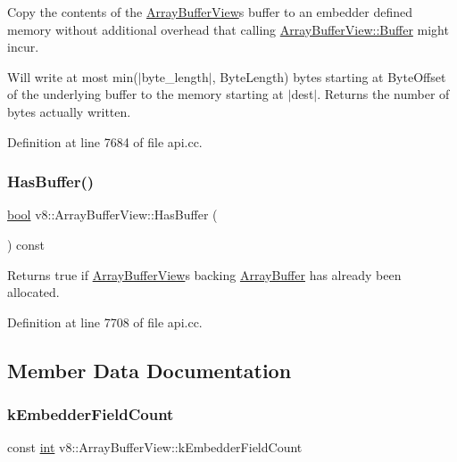 Copy the contents of the \mbox{\hyperlink{classv8_1_1ArrayBufferView}{Array\+Buffer\+View}}\textquotesingle{}s buffer to an embedder defined memory without additional overhead that calling \mbox{\hyperlink{classv8_1_1ArrayBufferView_a134c62b37be7a9e8437a56b832f1800a}{Array\+Buffer\+View\+::\+Buffer}} might incur.

Will write at most min($\vert$byte\+\_\+length$\vert$, Byte\+Length) bytes starting at Byte\+Offset of the underlying buffer to the memory starting at $\vert$dest$\vert$. Returns the number of bytes actually written. 

Definition at line 7684 of file api.\+cc.

\mbox{\label{classv8_1_1ArrayBufferView_ab1f5835c3dea53a625814a8c3ab2e0ae}} 
\subsubsection{\texorpdfstring{Has\+Buffer()}{HasBuffer()}}
{\footnotesize\ttfamily \mbox{\hyperlink{classbool}{bool}} v8\+::\+Array\+Buffer\+View\+::\+Has\+Buffer (\begin{DoxyParamCaption}{ }\end{DoxyParamCaption}) const}

Returns true if \mbox{\hyperlink{classv8_1_1ArrayBufferView}{Array\+Buffer\+View}}\textquotesingle{}s backing \mbox{\hyperlink{classv8_1_1ArrayBuffer}{Array\+Buffer}} has already been allocated. 

Definition at line 7708 of file api.\+cc.



\subsection{Member Data Documentation}
\mbox{\label{classv8_1_1ArrayBufferView_a4c007c4f644125cee1b7605c9ea1bc6c}} 
\subsubsection{\texorpdfstring{k\+Embedder\+Field\+Count}{kEmbedderFieldCount}}
{\footnotesize\ttfamily const \mbox{\hyperlink{classint}{int}} v8\+::\+Array\+Buffer\+View\+::k\+Embedder\+Field\+Count\hspace{0.3cm}{\ttfamily [static]}}

